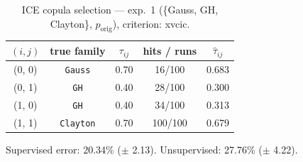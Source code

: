 \begin{table}[htbp]
  \centering
  \caption{ICE copula selection — exp.\ 1 (\{Gauss, GH, Clayton\}, $p_{\text{orig}}$), criterion: xvcic.}
  \label{tab:exp3-exp1_orig_p__xvcic}
  \begin{tabular}{ccccc}
    \toprule
    $(i, j)$ & true family & $\tau_{ij}$ & hits / runs & $\hat\tau_{ij}$ \\
    \midrule
    (0, 0) & \texttt{Gauss} & 0.70 & 16/100 & 0.683 \\
    (0, 1) & \texttt{GH} & 0.40 & 28/100 & 0.300 \\
    (1, 0) & \texttt{GH} & 0.40 & 34/100 & 0.313 \\
    (1, 1) & \texttt{Clayton} & 0.70 & 100/100 & 0.679 \\
    \bottomrule
  \end{tabular}
  \par\smallskip Supervised error: 20.34\% ($\pm$ 2.13). Unsupervised: 27.76\% ($\pm$ 4.22).
\end{table}
